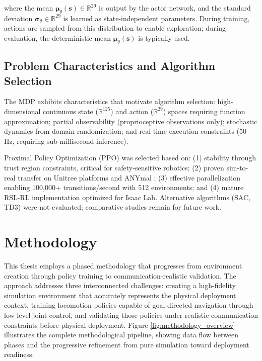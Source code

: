 \documentclass[12pt,a4paper]{article}
\begin{document}
where the mean $\boldsymbol{\mu}_\theta(\mathbf{s}) \in \mathbb{R}^{29}$ is output by the actor network, and the standard deviation $\boldsymbol{\sigma}_\theta \in \mathbb{R}^{29}$ is learned as state-independent parameters. During training, actions are sampled from this distribution to enable exploration; during evaluation, the deterministic mean $\boldsymbol{\mu}_\theta(\mathbf{s})$ is typically used.

\subsection{Problem Characteristics and Algorithm Selection}

The MDP exhibits characteristics that motivate algorithm selection: high-dimensional continuous state ($\mathbb{R}^{125}$) and action ($\mathbb{R}^{29}$) spaces requiring function approximation; partial observability (proprioceptive observations only); stochastic dynamics from domain randomization; and real-time execution constraints (50 Hz, requiring sub-millisecond inference).

Proximal Policy Optimization (PPO) \parencite{schulman2017proximal} was selected based on: (1) stability through trust region constraints, critical for safety-sensitive robotics; (2) proven sim-to-real transfer on Unitree platforms \parencite{gu2024humanoidgym} and ANYmal \parencite{hwangbo2019learning}; (3) effective parallelization enabling 100,000+ transitions/second with 512 environments; and (4) mature RSL-RL implementation optimized for Isaac Lab. Alternative algorithms (SAC, TD3) were not evaluated; comparative studies remain for future work.

\newpage

\section{Methodology}

This thesis employs a phased methodology that progresses from environment creation through policy training to communication-realistic validation. The approach addresses three interconnected challenges: creating a high-fidelity simulation environment that accurately represents the physical deployment context, training locomotion policies capable of goal-directed navigation through low-level joint control, and validating those policies under realistic communication constraints before physical deployment. Figure \ref{fig:methodology_overview} illustrates the complete methodological pipeline, showing data flow between phases and the progressive refinement from pure simulation toward deployment readiness.
\end{document}

